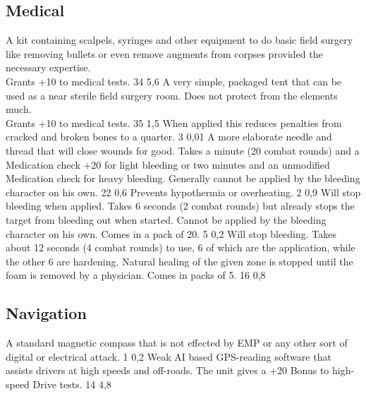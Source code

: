 \subsection{Medical}
\vspace{10mm}
\begin{multicols}{2}
    {A kit containing scalpels, syringes and other equipment to do basic field surgery
        like removing bullets or even remove augments from corpses provided the necessary expertise.\\
        Grants +10 to medical tests.}
    {34}
    {5,6}
    {A very simple, packaged tent that can be used as a near sterile field surgery room.
        Does not protect from the elements much.\\
        Grants +10 to medical tests.}
    {35}
    {1,5}
    {When applied this reduces penalties from cracked and broken bones to a quarter.}
    {3}
    {0,01}
    {A more elaborate needle and thread that will close wounds for good.
        Takes a minute (20 combat rounds) and a Medication check +20 for light bleeding
        or two minutes and an unmodified Medication check for heavy bleeding.
        Generally cannot be applied by the bleeding character on his own.}
    {22}
    {0,6}
    {Prevents hypothermia or overheating.}
    {2}
    {0,9}
    {Will stop bleeding when applied.
        Takes 6 seconds (2 combat rounds)
        but already stops the target from bleeding out when started.
        Cannot be applied by the bleeding character on his own.
        Comes in a pack of 20.}
    {5}
    {0,2}
    {Will stop bleeding.
        Takes about 12 seconds (4 combat rounds) to use,
        6 of which are the application,
        while the other 6 are hardening.
        Natural healing of the given zone is stopped until the foam is removed by a physician.
        Comes in packs of 5.}
    {16}
    {0,8}
\end{multicols}

\subsection{Navigation}
\vspace{10mm}
\begin{multicols}{2}
    {A standard magnetic compass
        that is not effected by EMP or any other sort of digital or electrical attack.}
    {1}
    {0,2}
    {Weak AI based GPS-reading software that assists drivers at high speeds and off-roads.
        The unit gives a +20 Bonus to high-speed Drive tests.}
    {14}
    {4,8}
\end{multicols}

